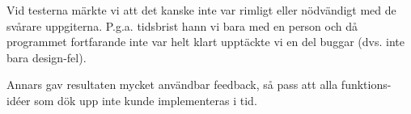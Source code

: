Vid testerna märkte vi att det kanske inte var rimligt eller nödvändigt med de
svårare uppgiterna.
P.g.a. tidsbrist hann vi bara med en person och då programmet
fortfarande inte var helt klart upptäckte vi en del buggar
(dvs. inte bara design-fel).

Annars gav resultaten mycket användbar feedback, så pass att alla
funktions-idéer som dök upp inte kunde implementeras i tid.
